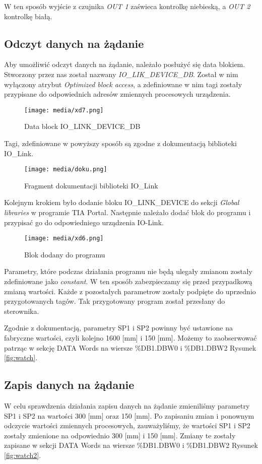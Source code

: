 \documentclass{article}
\begin{document}
W ten sposób wyjście z czujnika \textit{OUT 1} zaświeca kontrolkę niebieską, a \textit{OUT 2} kontrolkę białą.

\subsection{Odczyt danych na żądanie}

Aby umożliwić odczyt danych na żądanie, należało posłużyć się data blokiem. Stworzony przez nas został nazwany \textit{IO\_LIK\_DEVICE\_DB}. Został w nim wyłączony atrybut \textit{Optimized block access}, a zdefiniowane w nim tagi zostały przypisane do odpowiednich adresów zmiennych procesowych urządzenia.

\begin{figure}[H]
    \centering
    \texttt{[image: media/xd7.png]}
    \caption{Data block IO\_LINK\_DEVICE\_DB}
    \label{fig:db}
\end{figure}

Tagi, zdefiniowane w powyższy sposób są zgodne z dokumentacją biblioteki IO\_Link.
\begin{figure}[H]
    \centering
    \texttt{[image: media/doku.png]}
    \caption{Fragment dokumentacji biblioteki IO\_Link}
    \label{fig:tagi}
\end{figure}

Kolejnym krokiem było dodanie bloku IO\_LINK\_DEVICE do sekcji \textit{Global libraries} w programie TIA Portal. Następnie należało dodać blok do programu i przypisać go do odpowiedniego urządzenia IO-Link. 

\begin{figure}[H]
    \centering
    \texttt{[image: media/xd6.png]}
    \caption{Blok dodany do programu}
    \label{fig:blok}
\end{figure}

Parametry, które podczas działania programu nie będą ulegały zmianom zostały zdefiniowane jako \textit{constant}. W ten sposób zabezpieczamy się przed przypadkową zmianą wartości. Każde z pozostałych parametrow zostały podpięte do uprzednio przygotowanych tagów. Tak przygotowany program został przesłany do sterownika.

Zgodnie z dokumentacją, parametry SP1 i SP2 powinny być ustawione na fabryczne wartości, czyli kolejno 1600 [mm] i 150 [mm]. Możemy to zaobserwować patrząc w sekcję DATA Words na wiersze \%DB1.DBW0 i \%DB1.DBW2 Rysunek \ref{fig:watch}.

\subsection{Zapis danych na żądanie}
W celu sprawdzenia działania zapisu danych na żądanie zmieniliśmy parametry SP1 i SP2 na wartości 300 [mm] oraz 150 [mm]. Po zapisaniu zmian i ponownym odczycie wartości zmiennych procesowych, zauważyliśmy, że wartości SP1 i SP2 zostały zmienione na odpowiednio 300 [mm] i 150 [mm]. Zmiany te zostały zapisane w sekcji DATA Words na wiersze \%DB1.DBW0 i \%DB1.DBW2 Rysunek \ref{fig:watch2}.
\end{document}
